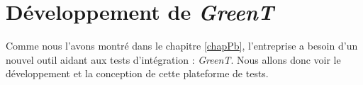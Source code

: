 \chapter{Développement de \textit{\textit{GreenT}}}
Comme nous l'avons montré dans le chapitre \ref{chapPb}, l'entreprise a besoin d'un nouvel outil aidant aux tests d'intégration : \textit{GreenT}. Nous allons donc voir le développement et la conception de cette plateforme de tests.

	
	
	
	